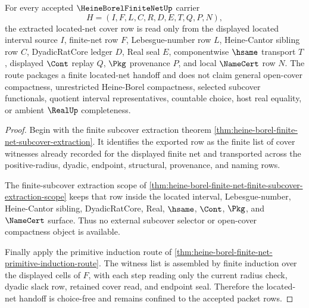 \begin{theorem}
\label{thm:heine-borel-choice-free-located-net}
For every accepted $\HeineBorelFiniteNetUp$ carrier
$$
H=(I,F,L,C,R,D,E,T,Q,P,N),
$$
the extracted located-net cover row is read only from the displayed located interval source $I$, finite-net row $F$, Lebesgue-number row $L$, Heine-Cantor sibling row $C$, DyadicRatCore ledger $D$, Real seal $E$, componentwise $\hsame$ transport $T$, displayed $\Cont$ replay $Q$, $\Pkg$ provenance $P$, and local $\NameCert$ row $N$. The route packages a finite located-net handoff and does not claim general open-cover compactness, unrestricted Heine-Borel compactness, selected subcover functionals, quotient interval representatives, countable choice, host real equality, or ambient $\RealUp$ completeness.
\end{theorem}
\begin{proof}
Begin with the finite subcover extraction theorem \autoref{thm:heine-borel-finite-net-subcover-extraction}. It identifies the exported row as the finite list of cover witnesses already recorded for the displayed finite net and transported across the positive-radius, dyadic, endpoint, structural, provenance, and naming rows.

The finite-subcover extraction scope of \autoref{thm:heine-borel-finite-net-finite-subcover-extraction-scope} keeps that row inside the located interval, Lebesgue-number, Heine-Cantor sibling, DyadicRatCore, Real, $\hsame$, $\Cont$, $\Pkg$, and $\NameCert$ surface. Thus no external subcover selector or open-cover compactness object is available.

Finally apply the primitive induction route of \autoref{thm:heine-borel-finite-net-primitive-induction-route}. The witness list is assembled by finite induction over the displayed cells of $F$, with each step reading only the current radius check, dyadic slack row, retained cover read, and endpoint seal. Therefore the located-net handoff is choice-free and remains confined to the accepted packet rows.
\end{proof}

